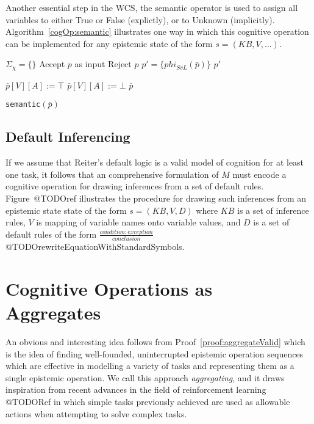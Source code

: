 Another essential step in the WCS, the semantic operator is used to assign all variables to either True or False (explictly), or to Unknown (implicitly). Algorithm~\ref{cogOp:semantic} illustrates one way in which this cognitive operation can be implemented for any epistemic state of the form $s=(KB,V,...)$.

\begin{algorithm}[H] \label{cogOp:semantic}
\SetAlgoLined
{}
{
$\Sigma_{\chi}=\{\}$\;
{
Accept $p$ as input\;
}
{
Reject $p$\;
}
}
{
$p'= \{phi_{SvL}(\bar{p})\}$\;
\Return $p'$
}

{
{
{
$\bar{p}[V][A]:=\top$
}
}
{
{
$\bar{p}[V][A]:=\bot$
}
}
\Return $\bar{p}$
}

\caption{\texttt{semantic}$(\bar{p})$}
\end{algorithm}

\subsection{Default Inferencing}
If we assume that Reiter's default logic is a valid model of cognition for at least one task, it follows that an comprehensive formulation of $M$ must encode a cognitive operation for drawing inferences from a set of default rules. Figure~@TODOref illustrates the procedure for drawing such inferences from an epistemic state state of the form $s=(KB,V,D)$ where $KB$ is a set of inference rules, $V$ is mapping of variable names onto variable values, and $D$ is a set of default rules of the form $\frac{condition:exception}{conclusion}$ @TODOrewriteEquationWithStandardSymbols.



\section{Cognitive Operations as Aggregates}
An obvious and interesting idea follows from Proof~\ref{proof:aggregateValid} which is the idea of finding well-founded, uninterrupted epistemic operation sequences which are effective in modelling a variety of tasks and representing them as a single epistemic operation. We call this approach \textit{aggregating}, and it draws inspiration from recent advances in the field of reinforcement learning @TODORef in which simple tasks previously achieved are used as allowable actions when attempting to solve complex tasks.

